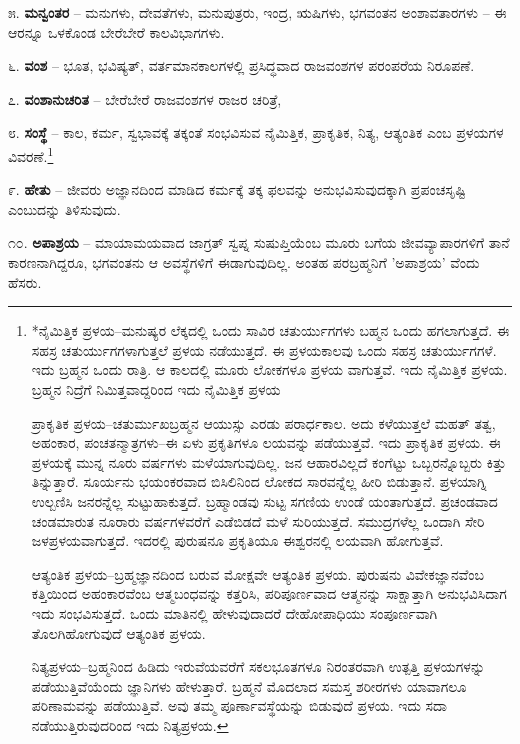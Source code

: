 ೫. \textbf{ಮನ್ವಂತರ} – ಮನುಗಳು, ದೇವತೆಗಳು, ಮನುಪುತ್ರರು, ಇಂದ್ರ, ಋಷಿಗಳು, ಭಗವಂತನ ಅಂಶಾವತಾರಗಳು – ಈ ಆರನ್ನೂ ಒಳಕೊಂಡ ಬೇರೆಬೇರೆ ಕಾಲವಿಭಾಗಗಳು.

೬. \textbf{ವಂಶ} – ಭೂತ, ಭವಿಷ್ಯತ್, ವರ್ತಮಾನಕಾಲಗಳಲ್ಲಿ ಪ್ರಸಿದ್ಧವಾದ ರಾಜವಂಶಗಳ ಪರಂಪರೆಯ ನಿರೂಪಣೆ.

೭. \textbf{ವಂಶಾನುಚರಿತ} – ಬೇರೆಬೇರೆ ರಾಜವಂಶಗಳ ರಾಜರ ಚರಿತ್ರೆ,

೮. \textbf{ಸಂಸ್ಥೆ} – ಕಾಲ, ಕರ್ಮ, ಸ್ವಭಾವಕ್ಕೆ ತಕ್ಕಂತೆ ಸಂಭವಿಸುವ ನೈಮಿತ್ತಿಕ, ಪ್ರಾಕೃತಿಕ, ನಿತ್ಯ, ಆತ್ಯಂತಿಕ ಎಂಬ ಪ್ರಳಯಗಳ ವಿವರಣೆ.\footnote{*ನೈಮಿತ್ತಿಕ ಪ್ರಳಯ–ಮನುಷ್ಯರ ಲೆಕ್ಕದಲ್ಲಿ ಒಂದು ಸಾವಿರ ಚತುರ್ಯುಗಗಳು ಬಹ್ಮನ ಒಂದು ಹಗಲಾಗುತ್ತದೆ. ಈ ಸಹಸ್ರ ಚತುರ್ಯುಗಗಳಾಗುತ್ತಲೆ ಪ್ರಳಯ ನಡೆಯುತ್ತದೆ. ಈ ಪ್ರಳಯಕಾಲವು ಒಂದು ಸಹಸ್ರ ಚತುರ್ಯುಗಗಳೆ. ಇದು ಬ್ರಹ್ಮನ ಒಂದು ರಾತ್ರಿ. ಆ ಕಾಲದಲ್ಲಿ ಮೂರು ಲೋಕಗಳೂ ಪ್ರಳಯ ವಾಗುತ್ತವೆ. ಇದು ನೈಮಿತ್ತಿಕ ಪ್ರಳಯ. ಬ್ರಹ್ಮನ ನಿದ್ರೆಗೆ ನಿಮಿತ್ತವಾದ್ದರಿಂದ ಇದು ನೈಮಿತ್ತಿಕ ಪ್ರಳಯ

ಪ್ರಾಕೃತಿಕ ಪ್ರಳಯ–ಚತುರ್ಮುಖಬ್ರಹ್ಮನ ಆಯುಸ್ಸು ಎರಡು ಪರಾರ್ಧಕಾಲ. ಅದು ಕಳೆಯುತ್ತಲೆ ಮಹತ್ ತತ್ವ, ಅಹಂಕಾರ, ಪಂಚತನ್ಮಾತ್ರಗಳು–ಈ ಏಳು ಪ್ರಕೃತಿಗಳೂ ಲಯವನ್ನು ಪಡೆಯುತ್ತವೆ. ಇದು ಪ್ರಾಕೃತಿಕ ಪ್ರಳಯ. ಈ ಪ್ರಳಯಕ್ಕೆ ಮುನ್ನ ನೂರು ವರ್ಷಗಳು ಮಳೆಯಾಗುವುದಿಲ್ಲ. ಜನ ಆಹಾರವಿಲ್ಲದೆ ಕಂಗೆಟ್ಟು ಒಬ್ಬರನ್ನೊಬ್ಬರು ಕಿತ್ತು ತಿನ್ನುತ್ತಾರೆ. ಸೂರ್ಯನು ಭಯಂಕರವಾದ ಬಿಸಿಲಿನಿಂದ ಲೋಕದ ಸಾರವನ್ನೆಲ್ಲ ಹೀರಿ ಬಿಡುತ್ತಾನೆ. ಪ್ರಳಯಾಗ್ನಿ ಉಲ್ಬಣಿಸಿ ಜನರನ್ನೆಲ್ಲ ಸುಟ್ಟುಹಾಕುತ್ತದೆ. ಬ್ರಹ್ಮಾಂಡವು ಸುಟ್ಟ ಸಗಣಿಯ ಉಂಡೆ ಯಂತಾಗುತ್ತದೆ. ಪ್ರಚಂಡವಾದ ಚಂಡಮಾರುತ ನೂರಾರು ವರ್ಷಗಳವರೆಗೆ ಎಡೆಬಿಡದೆ ಮಳೆ ಸುರಿಯುತ್ತದೆ. ಸಮುದ್ರಗಳೆಲ್ಲ ಒಂದಾಗಿ ಸೇರಿ ಜಳಪ್ರಳಯವಾಗುತ್ತದೆ. ಇದರಲ್ಲಿ ಪುರುಷನೂ ಪ್ರಕೃತಿಯೂ ಈಶ್ವರನಲ್ಲಿ ಲಯವಾಗಿ ಹೋಗುತ್ತವೆ.

ಆತ್ಯಂತಿಕ ಪ್ರಳಯ–ಬ್ರಹ್ಮಜ್ಞಾನದಿಂದ ಬರುವ ಮೋಕ್ಷವೇ ಆತ್ಯಂತಿಕ ಪ್ರಳಯ. ಪುರುಷನು ವಿವೇಕಜ್ಞಾನವೆಂಬ ಕತ್ತಿಯಿಂದ ಅಹಂಕಾರವೆಂಬ ಆತ್ಮಬಂಧವನ್ನು ಕತ್ತರಿಸಿ, ಪರಿಪೂರ್ಣವಾದ ಆತ್ಮನನ್ನು ಸಾಕ್ಷಾತ್ತಾಗಿ ಅನುಭವಿಸಿದಾಗ ಇದು ಸಂಭವಿಸುತ್ತದೆ. ಒಂದು ಮಾತಿನಲ್ಲಿ ಹೇಳುವುದಾದರೆ ದೇಹೋಪಾಧಿಯು ಸಂಪೂರ್ಣವಾಗಿ ತೊಲಗಿಹೋಗುವುದೆ ಆತ್ಯಂತಿಕ ಪ್ರಳಯ.

ನಿತ್ಯಪ್ರಳಯ–ಬ್ರಹ್ಮನಿಂದ ಹಿಡಿದು ಇರುವೆಯವರೆಗೆ ಸಕಲಭೂತಗಳೂ ನಿರಂತರವಾಗಿ ಉತ್ಪತ್ತಿ ಪ್ರಳಯಗಳನ್ನು ಪಡೆಯುತ್ತಿವೆಯೆಂದು ಜ್ಞಾನಿಗಳು ಹೇಳುತ್ತಾರೆ. ಬ್ರಹ್ಮನೆ ಮೊದಲಾದ ಸಮಸ್ತ ಶರೀರಗಳು ಯಾವಾಗಲೂ ಪರಿಣಾಮವನ್ನು ಪಡೆಯುತ್ತಿವೆ. ಅವು ತಮ್ಮ ಪೂರ್ಣಾವಸ್ಥೆಯನ್ನು ಬಿಡುವುದೆ ಪ್ರಳಯ. ಇದು ಸದಾ ನಡೆಯುತ್ತಿರುವುದರಿಂದ ಇದು ನಿತ್ಯಪ್ರಳಯ.}

೯. \textbf{ಹೇತು} – ಜೀವರು ಅಜ್ಞಾನದಿಂದ ಮಾಡಿದ ಕರ್ಮಕ್ಕೆ ತಕ್ಕ ಫಲವನ್ನು ಅನುಭವಿಸುವುದಕ್ಕಾಗಿ ಪ್ರಪಂಚಸೃಷ್ಟಿ ಎಂಬುದನ್ನು ತಿಳಿಸುವುದು.

೧೦. \textbf{ಅಪಾಶ್ರಯ} – ಮಾಯಾಮಯವಾದ ಜಾಗ್ರತ್ ಸ್ವಪ್ನ ಸುಷುಪ್ತಿಯೆಂಬ ಮೂರು ಬಗೆಯ ಜೀವವ್ಯಾಪಾರಗಳಿಗೆ ತಾನೆ ಕಾರಣನಾಗಿದ್ದರೂ, ಭಗವಂತನು ಆ ಅವಸ್ಥೆಗಳಿಗೆ ಈಡಾಗುವುದಿಲ್ಲ. ಅಂತಹ ಪರಬ್ರಹ್ಮನಿಗೆ 'ಅಪಾಶ್ರಯ' ವೆಂದು ಹೆಸರು.

